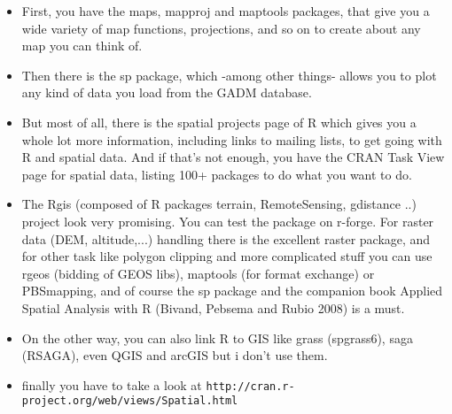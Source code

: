 \documentclass{beamer}
\begin{document}
\begin{frame}
\begin{itemize}
\item First, you have the maps, mapproj and maptools packages, that give you a wide variety of map functions, projections, and so on to create about any map you can think of.

\item Then there is the sp package, which -among other things- allows you to plot any kind of data you load from the GADM database.

\item But most of all, there is the spatial projects page of R which gives you a whole lot more information, including links to mailing lists, to get going with R and spatial data. And if that's not enough, you have the CRAN Task View page for spatial data, listing 100+ packages to do what you want to do.
\end{itemize}
\end{frame}
\begin{frame}
\begin{itemize}
\item The Rgis (composed of R packages terrain, RemoteSensing, gdistance ..) project look very promising. You can test the package on r-forge. For raster data (DEM, altitude,...) handling there is the excellent raster package, and for other task like polygon clipping and more complicated stuff you can use rgeos (bidding of GEOS libs), maptools (for format exchange) or PBSmapping, and of course the sp package and the companion book Applied Spatial Analysis with R (Bivand, Pebsema and Rubio 2008) is a must.

\item On the other way, you can also link R to GIS like grass (spgrass6), saga (RSAGA), even QGIS and arcGIS but i don't use them.

\item finally you have to take a look at \texttt{http://cran.r-project.org/web/views/Spatial.html}
\end{itemize}
\end{frame}
\end{document}
